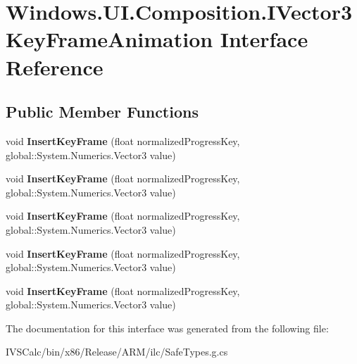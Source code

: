 \hypertarget{interface_windows_1_1_u_i_1_1_composition_1_1_i_vector3_key_frame_animation}{}\section{Windows.\+U\+I.\+Composition.\+I\+Vector3\+Key\+Frame\+Animation Interface Reference}
\label{interface_windows_1_1_u_i_1_1_composition_1_1_i_vector3_key_frame_animation}
\subsection*{Public Member Functions}
\begin{DoxyCompactItemize}
\item 
\mbox{\label{interface_windows_1_1_u_i_1_1_composition_1_1_i_vector3_key_frame_animation_a918f6182f7adc6b4c707bad5e79c4c3f}} 
void {\bfseries Insert\+Key\+Frame} (float normalized\+Progress\+Key, global\+::\+System.\+Numerics.\+Vector3 value)
\item 
\mbox{\label{interface_windows_1_1_u_i_1_1_composition_1_1_i_vector3_key_frame_animation_a918f6182f7adc6b4c707bad5e79c4c3f}} 
void {\bfseries Insert\+Key\+Frame} (float normalized\+Progress\+Key, global\+::\+System.\+Numerics.\+Vector3 value)
\item 
\mbox{\label{interface_windows_1_1_u_i_1_1_composition_1_1_i_vector3_key_frame_animation_a918f6182f7adc6b4c707bad5e79c4c3f}} 
void {\bfseries Insert\+Key\+Frame} (float normalized\+Progress\+Key, global\+::\+System.\+Numerics.\+Vector3 value)
\item 
\mbox{\label{interface_windows_1_1_u_i_1_1_composition_1_1_i_vector3_key_frame_animation_a918f6182f7adc6b4c707bad5e79c4c3f}} 
void {\bfseries Insert\+Key\+Frame} (float normalized\+Progress\+Key, global\+::\+System.\+Numerics.\+Vector3 value)
\item 
\mbox{\label{interface_windows_1_1_u_i_1_1_composition_1_1_i_vector3_key_frame_animation_a918f6182f7adc6b4c707bad5e79c4c3f}} 
void {\bfseries Insert\+Key\+Frame} (float normalized\+Progress\+Key, global\+::\+System.\+Numerics.\+Vector3 value)
\end{DoxyCompactItemize}


The documentation for this interface was generated from the following file\+:\begin{DoxyCompactItemize}
\item 
I\+V\+S\+Calc/bin/x86/\+Release/\+A\+R\+M/ilc/Safe\+Types.\+g.\+cs\end{DoxyCompactItemize}
